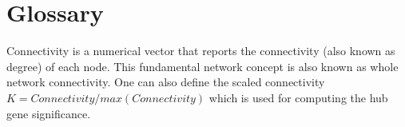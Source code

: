 \section{Glossary}
Connectivity is a numerical vector that reports the connectivity (also known as degree) of each node. This fundamental network concept is also known as whole network connectivity. One can also define the scaled connectivity $K = Connectivity/max(Connectivity)$ which is used for computing the hub gene significance.
